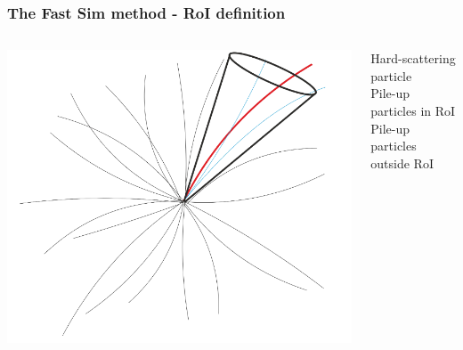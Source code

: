 \documentclass{beamer}
\begin{document}

\begin{frame}
\frametitle{The Fast Sim method - RoI definition}

\begin{columns}[t]
	\begin{column}{.7\textwidth}
		\includegraphics[width=\textwidth,valign=T]{cone}
	\end{column}
	\begin{column}{.3\textwidth}
		
		\small
		{\color{red} Hard-scattering particle} \\
		\vskip0.8cm
		{\color{cyan} Pile-up particles in RoI} \\
		\vskip0.8cm
		{\color{gray} Pile-up particles outside RoI} \\
		\vskip1.5cm
	\end{column}
\end{columns}
	
\end{frame}

\end{document}
